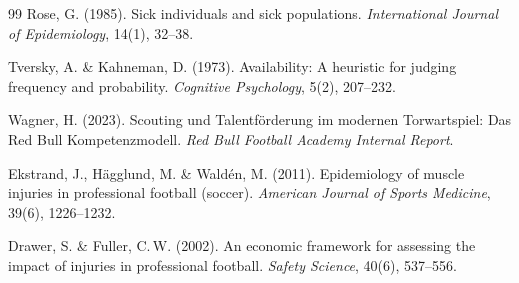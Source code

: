\documentclass[12pt,a4paper]{article}
\begin{document}
\begin{thebibliography}{99}
Rose, G. (1985).
\newblock Sick individuals and sick populations.
\newblock \emph{International Journal of Epidemiology}, 14(1), 32--38.

Tversky, A. \& Kahneman, D. (1973).
\newblock Availability: A heuristic for judging frequency and probability.
\newblock \emph{Cognitive Psychology}, 5(2), 207--232.

Wagner, H. (2023).
\newblock Scouting und Talentf\"orderung im modernen Torwartspiel: Das Red Bull Kompetenzmodell.
\newblock \emph{Red Bull Football Academy Internal Report}.

Ekstrand, J., H\"agglund, M. \& Wald\'en, M. (2011).
\newblock Epidemiology of muscle injuries in professional football (soccer).
\newblock \emph{American Journal of Sports Medicine}, 39(6), 1226--1232.

Drawer, S. \& Fuller, C.\,W. (2002).
\newblock An economic framework for assessing the impact of injuries in professional football.
\newblock \emph{Safety Science}, 40(6), 537--556.

\end{thebibliography}
\end{document}

